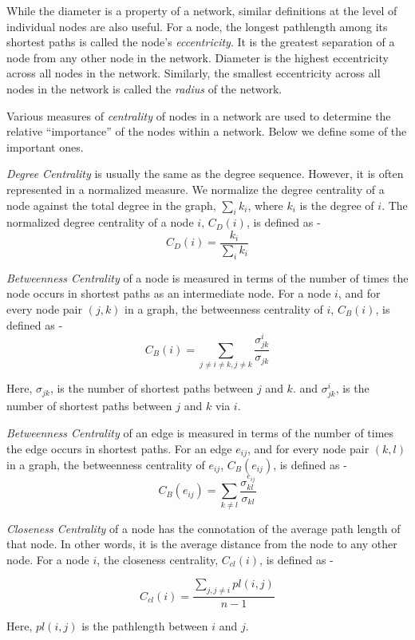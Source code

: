 \documentclass[a4paper,10pt]{article}
\begin{document}
While the diameter is a property of a network, similar definitions at the level of individual nodes are also useful. For a node, the longest pathlength among its shortest paths is called the node's \textit{eccentricity}. It is the greatest separation of a node from any other node in the network. Diameter is the highest eccentricity across all nodes in the network. Similarly, the smallest eccentricity across all nodes in the network is called the \textit{radius} of the network.

Various measures of \textit{centrality} of nodes in a network are used to determine the relative ``importance'' of the nodes within a network. Below we define some of the important ones.

\textit{Degree Centrality} is usually the same as the degree sequence. However, it is often represented in a normalized measure. We normalize the degree centrality of a node against the total degree in the graph, $\sum_{i}k_{i}$, where $k_{i}$ is the degree of $i$. The normalized degree centrality of a node $i$, $C_{D}(i)$, is defined as -
\[C_{D}(i) = \frac{k_{i}}{\sum_{i}k_{i}}\]

\textit{Betweenness Centrality} of a node is measured in terms of the number of times the node occurs in shortest paths as an intermediate node. For a node $i$, and for every node pair $(j, k)$ in a graph, the betweenness centrality of $i$, $C_{B}(i)$, is defined as -
\[C_{B}(i) = \sum_{j \ne i \ne k, j \ne k}\frac{\sigma_{jk}^{i}}{\sigma_{jk}}\]

Here, $\sigma_{jk}$, is the number of shortest paths between $j$ and $k$. and $\sigma_{jk}^{i}$, is the number of shortest paths between $j$ and $k$ via $i$.

\textit{Betweenness Centrality} of an edge is measured in terms of the number of times the edge occurs in shortest paths. For an edge $e_{ij}$, and for every node pair $(k, l)$ in a graph, the betweenness centrality of $e_{ij}$, $C_{B}(e_{ij})$, is defined as - 
\[C_{B}(e_{ij}) = \sum_{k \ne l}\frac{\sigma_{kl}^{e_{ij}}}{\sigma_{kl}}\]

\textit{Closeness Centrality} of a node has the connotation of the average path length of that node. In other words, it is the average distance from the node to any other node. For a node $i$, the closeness centrality, $C_{cl}(i)$, is defined as -

\[C_{cl}(i) = \frac{\sum_{j, j \ne i} pl(i, j)}{n - 1}\]

Here, $pl(i, j)$ is the pathlength between $i$ and $j$.
\end{document}
